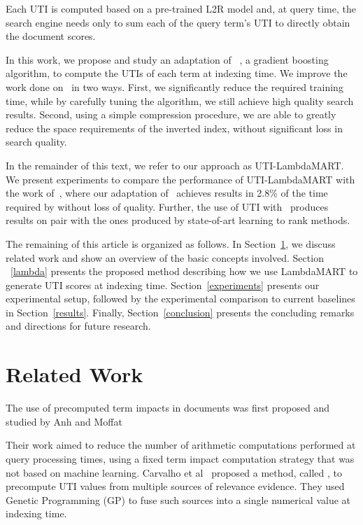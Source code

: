 \documentclass[preprint,review,10pt,3p]{elsarticle}
\begin{document}
Each UTI is computed based on a pre-trained L2R model and, at query time, the search engine needs only to sum each of the query term's UTI to directly obtain the document scores.

In this work, we propose and study an adaptation of \lambdamart~\cite{wu2010lambdamart}, a gradient boosting algorithm, to compute the UTIs of each term at indexing time.
We improve the work done on \lepref\ in two ways. First, we significantly reduce the required training time, while by carefully tuning the algorithm, we still achieve high quality search results. Second, using a simple compression procedure, we are able to greatly reduce the space requirements of the inverted index, without significant loss in search quality. 

In the remainder of this text, we refer to our approach as UTI-LambdaMART. We present experiments to compare the performance of UTI-LambdaMART with the work of~\cite{costa2012lepref},
where our adaptation of \lambdamart\ achieves results in 2.8\% of the time required by \lepref %
without loss of quality. Further, the use of UTI with \lambdamart\ produces results on pair with the ones produced by state-of-art learning to rank methods.

The remaining of this article is organized as follows. In Section~\ref{relatedwork}, we discuss related work and show an overview of the basic concepts involved. Section ~\ref{lambda} presents the proposed method describing how we use LambdaMART to generate UTI scores at indexing time. Section~\ref{experiments} presents our experimental setup, followed by the experimental comparison to current baselines in Section~\ref{results}. Finally, Section~\ref{conclusion} presents the concluding remarks and directions for future research.

\section{Related Work}
\label{relatedwork}

The use of precomputed term impacts in documents was first proposed and studied by Anh and Moffat~\cite{Anh:2002:ITE:564376.564380}

Their work aimed to reduce the number of arithmetic computations performed at query processing times, using a fixed term impact computation strategy that was not based on machine learning. Carvalho et al~\cite{costa2012lepref} proposed a method, called \lepref, to precompute UTI values from multiple sources of relevance evidence. They used Genetic Programming (GP) to fuse such sources into a single numerical value at indexing time.
\end{document}
